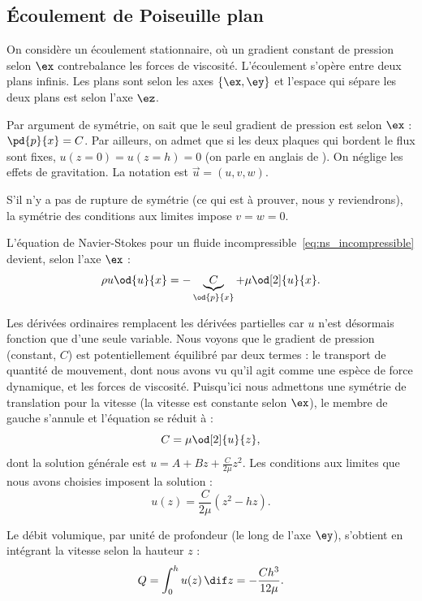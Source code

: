 \subsection{Écoulement de Poiseuille plan}

On considère un écoulement stationnaire, où un gradient constant de pression selon $\ex$ contrebalance les forces de viscosité. L'écoulement s'opère entre deux plans infinis. Les plans sont selon les axes $\{\ex, \ey\}$ et l'espace qui sépare les deux plans est selon l'axe $\ez$.

Par argument de symétrie, on sait que le seul gradient de pression est selon $\ex$ : $\pd{p}{x} = C$. Par ailleurs, on admet que si les deux plaques qui bordent le flux sont fixes, $u(z=0) = u(z=h) = 0$ (on parle en anglais de \emph{}). On néglige les effets de gravitation. La notation est $\vec{u} = (u, v, w)$.

S'il n'y a pas de rupture de symétrie (ce qui est à prouver, nous y reviendrons), la symétrie des conditions aux limites impose $v = w = 0$.

L'équation de Navier-Stokes pour un fluide incompressible~\eqref{eq:ns_incompressible} devient, selon l'axe $\ex$ :
\begin{equation}
  \rho u \od{u}{x} = -\underbrace{C}_{\od{p}{x}} + \mu \od[2]{u}{x}.
  \label{eq:couette_plan}
\end{equation}

Les dérivées ordinaires remplacent les dérivées partielles car $u$ n'est désormais fonction que d'une seule variable. Nous voyons que le gradient de pression (constant, $C$) est potentiellement équilibré par deux termes : le transport de quantité de mouvement, dont nous avons vu qu'il agit comme une espèce de force dynamique, et les forces de viscosité. Puisqu'ici nous admettons une symétrie de translation pour la vitesse (la vitesse est constante selon $\ex$), le membre de gauche s'annule et l'équation se réduit à :
\begin{displaymath}
  C = \mu \od[2]{u}{z},
\end{displaymath}
dont la solution générale est $u = A + Bz + \frac{C}{2\mu}z^2$. Les conditions aux limites que nous avons choisies imposent la solution :
\begin{displaymath}
  u(z) = \frac{C}{2\mu} (z^2 - h z).
\end{displaymath}

Le débit volumique, par unité de profondeur (le long de l'axe $\ey$), s'obtient en intégrant la vitesse selon la hauteur $z$ :
\begin{displaymath}
  Q = \int_{0}^h u(z)\,\dif z = - \frac{C h^3}{12\mu}.
\end{displaymath}

